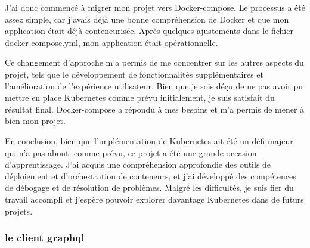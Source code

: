 J'ai donc commencé à migrer mon projet vers Docker-compose.
Le processus a été assez simple, car j'avais déjà une bonne compréhension de Docker et que mon application était déjà conteneurisée.
Après quelques ajustements dans le fichier docker-compose.yml, mon application était opérationnelle.

Ce changement d'approche m'a permis de me concentrer sur les autres aspects du projet,
tels que le développement de fonctionnalités supplémentaires et l'amélioration de l'expérience utilisateur.
Bien que je sois déçu de ne pas avoir pu mettre en place Kubernetes comme prévu initialement,
je suis satisfait du résultat final.
Docker-compose a répondu à mes besoins et m'a permis de mener à bien mon projet.

En conclusion, bien que l'implémentation de Kubernetes ait été un défi majeur qui n'a pas abouti comme prévu,
ce projet a été une grande occasion d'apprentissage.
J'ai acquis une compréhension approfondie des outils de déploiement et d'orchestration de conteneurs,
et j'ai développé des compétences de débogage et de résolution de problèmes.
Malgré les difficultés, je suis fier du travail accompli et j'espère pouvoir explorer davantage Kubernetes dans de futurs projets.

\subsubsection{le client graphql}
